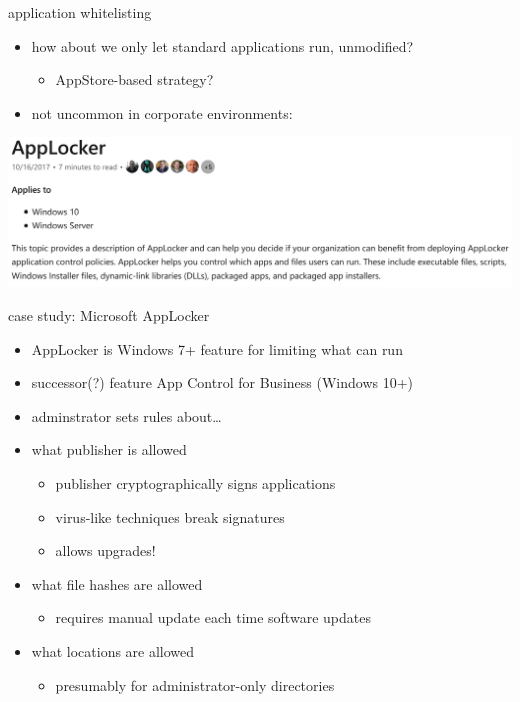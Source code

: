 \begin{frame}{application whitelisting}
\begin{itemize}
\item how about we only let standard applications run, unmodified?
    \begin{itemize}
    \item AppStore-based strategy?
    \end{itemize}
\item not uncommon in corporate environments:
\end{itemize}
\vspace{.5cm}
\includegraphics[width=\textwidth]{../heur-detect/applocker-manual}
\end{frame}

\begin{frame}{case study: Microsoft AppLocker}
    \begin{itemize}
    \item AppLocker is Windows 7+ feature for limiting what can run
    \item successor(?) feature App Control for Business (Windows 10+)
    \item adminstrator sets rules about\ldots
    \item what publisher is allowed
        \begin{itemize}
        \item publisher cryptographically signs applications
        \item virus-like techniques break signatures
        \item allows upgrades!
        \end{itemize}
    \item what file hashes are allowed
        \begin{itemize}
        \item requires manual update each time software updates
        \end{itemize}
    \item what locations are allowed
        \begin{itemize}
        \item presumably for administrator-only directories
        \end{itemize}
    \end{itemize}
\end{frame}

